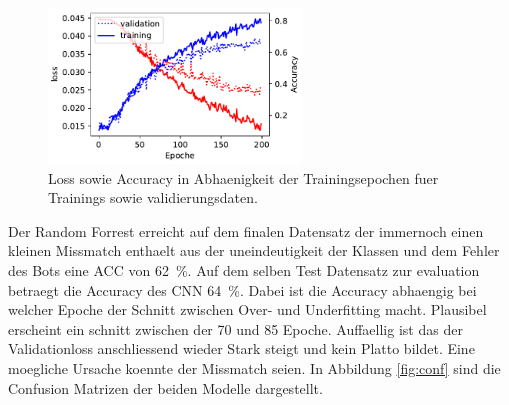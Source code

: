 \begin{figure}
		\centering
		\includegraphics[width=0.6\textwidth]{pictures/train_nn.pdf}
		\caption{Loss sowie Accuracy in Abhaenigkeit der Trainingsepochen fuer
		Trainings sowie validierungsdaten.}
		\label{fig:}
\end{figure}
Der Random Forrest erreicht auf dem finalen Datensatz der immernoch einen
kleinen Missmatch enthaelt aus der uneindeutigkeit der Klassen und dem Fehler
des Bots eine ACC von \SI{62}{\percent}. 
Auf dem selben Test Datensatz zur evaluation betraegt die Accuracy des CNN
\SI{64}{\percent}.
Dabei ist die Accuracy abhaengig bei welcher Epoche der Schnitt zwischen Over-
und Underfitting macht.
Plausibel erscheint ein schnitt zwischen der \num{70} und \num{85} Epoche.
Auffaellig ist das der Validationloss anschliessend wieder Stark steigt und kein
Platto bildet.
Eine moegliche Ursache koennte der Missmatch seien.
In Abbildung \ref{fig:conf} sind die Confusion Matrizen der beiden Modelle
dargestellt. 
